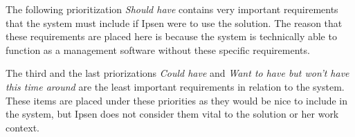 The following prioritization \textit{Should have} contains very important requirements that the system must include if Ipsen were to use the solution.
The reason that these requirements are placed here is because the system is technically able to function as a management software without these specific requirements.

The third and the last priorizations \textit{Could have} and \textit{Want to have but won't have this time around} are the least important requirements in relation to the system.
These items are placed under these priorities as they would be nice to include in the system, but Ipsen does not consider them vital to the solution or her work context.
